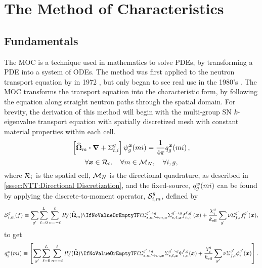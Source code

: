 \chapter{The Method of Characteristics}{\label{ch:The Method of Characteristics}
    
    
    
    \def\figpath{chapters/03/figures/}
    \graphicspath{ {\figpath} }

    \section{Fundamentals}{\label{sec:MOC:Fundamentals}
        The \acf{MOC} is a technique used in mathematics to solve \acp{PDE}, by transforming a \ac{PDE} into a system of \acp{ODE}.
        The method was first applied to the neutron transport equation by \citeauthor{Askew1972} in 1972 \cite{Askew1972}, but only began to see real use in the 1980's \cite{Halsall1980}.
        The \ac{MOC} transforms the transport equation into the characteristic form, by following the equation along straight neutron paths through the spatial domain.
        For brevity, the derivation of this method will begin with the multi-group \ac{SN} $k$-eigenvalue transport equation with spatially discretized mesh with constant material properties within each cell.
        \begin{equation}\label{eq:MOC:SSMGFS Transport}
            \left[\dirm\vdot\grad + \xst\right]\aflux[mi][g][\loc] = \rfourpi\source[mi][g][\loc],
        \end{equation}
        \begin{equation*}
            \forall\loc\in\Region, \quad \forall m \in \angquad, \quad \forall i, g,
        \end{equation*}
        where $\Region$ is the spatial cell, $\angquad$ is the directional quadrature, as described in \cref{sssec:NTT:Directional Discretization}, and the fixed-source, $
        \source[mi][g][\loc]$ can be found by applying the discrete-to-moment operator, $\FluxToSource$, defined by
        \begin{equation}\label{eq:MOC:LSA:Flux To Source Operator}
          \FluxToSource(f) \defined
            \suml[\gprime]\suml[\ell=0][L]\suml[n=-\ell][\ell]\SH[\ell][n][\dirm]\xss[\ell]f^{\ell,\gprime}_{n,i}(\loc)
            + \frac{\spect}{\keff}\suml[\gprime]\nufis f^{\gprime}_{i}(\loc),
        \end{equation}
        to get
        \begin{equation}\label{eq:MOC:Source}
            \source[mi][g][\loc] \defined
                \left[\suml[\gprime]\suml[\ell=0][L]\suml[n=-\ell][\ell]\SH\xss[\ell]\afluxmom(\loc) + \frac{\spect}{\keff}\suml[\gprime]\nufis\sflux[\gprime](\loc)\right].
        \end{equation}

}}

